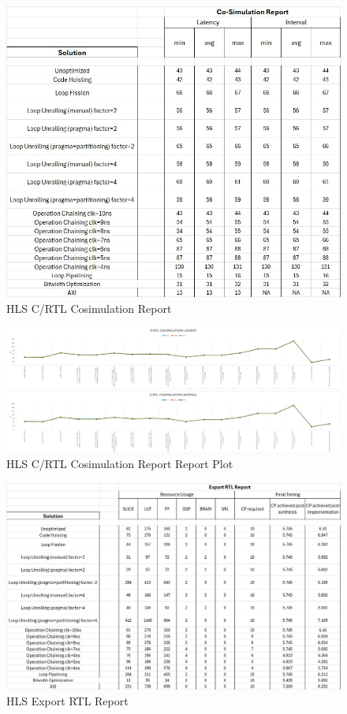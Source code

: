 \begin{figure}[H]
    \centering
    \includegraphics[width=0.7\textheight, angle=90]{conclusions/cosimulation.jpeg}
    \caption{HLS C/RTL Cosimulation Report}
    \label{fig:hls-crtl-cosimulation-report}
\end{figure}

\begin{figure}[H]
    \centering
    \includegraphics[width=0.9\textheight, angle=90]{conclusions/hlscosimulation.png}
    \caption{HLS C/RTL Cosimulation Report Report Plot}
    \label{fig:hls-synthesis-crtl-cosimulation-plot}
\end{figure}


\begin{figure}[H]
    \centering
    \includegraphics[width=0.9\textheight, angle=90]{conclusions/exportrtl.jpeg}
    \caption{HLS Export RTL Report}
    \label{fig:hls-export-rtl-report}
\end{figure}


